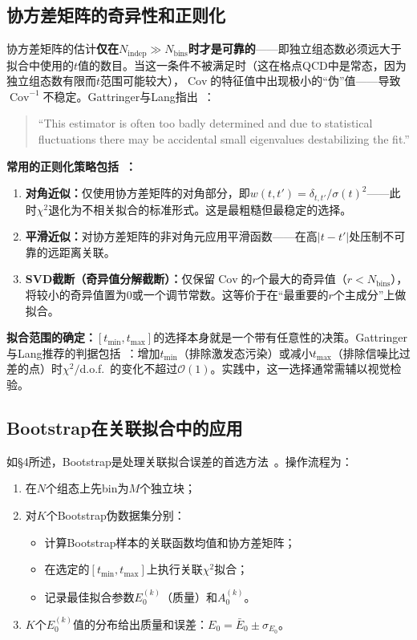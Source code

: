 \documentclass[12pt,a4paper]{ctexart}
\theoremstyle{definition}
\begin{document}
\subsection{协方差矩阵的奇异性和正则化}

协方差矩阵的估计\textbf{仅在$N_{\text{indep}} \gg N_{\text{bins}}$时才是可靠的}——即独立组态数必须远大于拟合中使用的$t$值的数目。当这一条件不被满足时（这在格点QCD中是常态，因为独立组态数有限而$t$范围可能较大），$\operatorname{Cov}$的特征值中出现极小的``伪''值——导致$\operatorname{Cov}^{-1}$不稳定。Gattringer与Lang指出~\cite{GattringerLang2010}：

\begin{quote}
``This estimator is often too badly determined and due to statistical fluctuations there may be accidental small eigenvalues destabilizing the fit.''
\end{quote}

\textbf{常用的正则化策略包括~\cite{GattringerLang2010}：}
\begin{enumerate}[nosep]
    \item \textbf{对角近似：}仅使用协方差矩阵的对角部分，即$w(t,t') = \delta_{t,t'}/\sigma(t)^2$——此时$\chi^2$退化为不相关拟合的标准形式。这是最粗糙但最稳定的选择。
    \item \textbf{平滑近似：}对协方差矩阵的非对角元应用平滑函数——在高$|t-t'|$处压制不可靠的远距离关联。
    \item \textbf{SVD截断（奇异值分解截断）：}仅保留$\operatorname{Cov}$的$r$个最大的奇异值（$r < N_{\text{bins}}$），将较小的奇异值置为0或一个调节常数。这等价于在``最重要的$r$个主成分''上做拟合。
\end{enumerate}

\textbf{拟合范围的确定：}$[t_{\min}, t_{\max}]$的选择本身就是一个带有任意性的决策。Gattringer与Lang推荐的判据包括~\cite{GattringerLang2010}：增加$t_{\min}$（排除激发态污染）或减小$t_{\max}$（排除信噪比过差的点）时$\chi^2/$d.o.f.\ 的变化不超过$\mathcal{O}(1)$。实践中，这一选择通常需辅以视觉检验。

\subsection{Bootstrap在关联拟合中的应用}

如§4所述，Bootstrap是处理关联拟合误差的首选方法~\cite{GattringerLang2010}。操作流程为：
\begin{enumerate}[nosep]
    \item 在$N$个组态上先bin为$M$个独立块；
    \item 对$K$个Bootstrap伪数据集分别：
    \begin{itemize}[nosep]
        \item 计算Bootstrap样本的关联函数均值和协方差矩阵；
        \item 在选定的$[t_{\min}, t_{\max}]$上执行关联$\chi^2$拟合；
        \item 记录最佳拟合参数$E_0^{(k)}$（质量）和$A_0^{(k)}$。
    \end{itemize}
    \item $K$个$E_0^{(k)}$值的分布给出质量和误差：$E_0 = \bar E_0 \pm \sigma_{E_0}$。
\end{enumerate}
\end{document}
